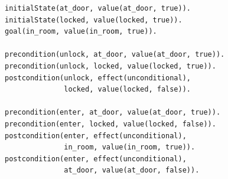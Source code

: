 \begin{lstlisting}[caption={Example \textit{plasp} output for a locked-door problem.},label={lst:plasp_example},style=asp]
initialState(at_door, value(at_door, true)).
initialState(locked, value(locked, true)).
goal(in_room, value(in_room, true)).

precondition(unlock, at_door, value(at_door, true)).
precondition(unlock, locked, value(locked, true)).
postcondition(unlock, effect(unconditional),
              locked, value(locked, false)).

precondition(enter, at_door, value(at_door, true)).
precondition(enter, locked, value(locked, false)).
postcondition(enter, effect(unconditional),
              in_room, value(in_room, true)).
postcondition(enter, effect(unconditional),
              at_door, value(at_door, false)).
\end{lstlisting}
